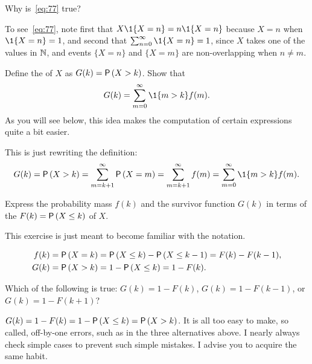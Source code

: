 \documentclass[companion.tex]{subfiles}
\begin{document}
\begin{extra}
 Why is~\cref{eq:77} true?
\begin{solution}
To see~\cref{eq:77}, note first that $X\1{X=n} = n\1{X=n}$ because $X=n$ when $\1{X=n} =1$, and second that $\sum_{n=0}^\infty \1{X=n} =1$, since $X$ takes one of the values in $\mathbb{N}$, and events $\{X=n\}$ and $\{X=m\}$ are non-overlapping when $n\neq m$. 
\end{solution}
\end{extra}

\begin{exercise}
Define the  of $X$ as $G(k) = \P{X>k}$. Show that
\begin{equation*}
 G(k) = \sum_{m=0}^\infty \1{m>k} f(m).
\end{equation*}
As you will see below, this idea makes the computation of certain expressions quite a bit easier.
\begin{solution}
 This is just rewriting the definition:
\begin{equation*}
G(k) = \P{X>k} = \sum_{m=k+1}^\infty \P{X=m} = \sum_{m=k+1}^\infty f(m)=\sum_{m=0}^\infty \1{m>k}f(m).
\end{equation*}
\end{solution}
\end{exercise}

\begin{exercise}
 Express the probability mass $f(k)$ and the survivor function $G(k)$ in terms of the  $F(k)=\P{X\leq k}$ of $X$.
\begin{hint}
This exercise is just meant to become familiar with the notation.
\end{hint}
\begin{solution}
 \begin{align*}
 f(k) &= \P{X=k} = \P{X\leq k} - \P{X\leq k-1} = F(k)-F(k-1), \\
 G(k) &= \P{X>k} = 1 - \P{X\leq k} = 1-F(k). 
 \end{align*}
\end{solution}
\end{exercise}

\begin{extra}
 Which of the following is true: $G(k) = 1-F(k)$, $G(k) = 1-F(k-1)$, or $G(k) = 1-F(k+1)$?
\begin{solution}
 $G(k) = 1- F(k) = 1-\P{X\leq k} = \P{X>k}$. 
 It is all too easy to make, so called, off-by-one errors, such as
 in the three alternatives above. I nearly always check simple
 cases to prevent such simple mistakes. I advise you to acquire the
 same habit.
\end{solution}
\end{extra}
\end{document}
